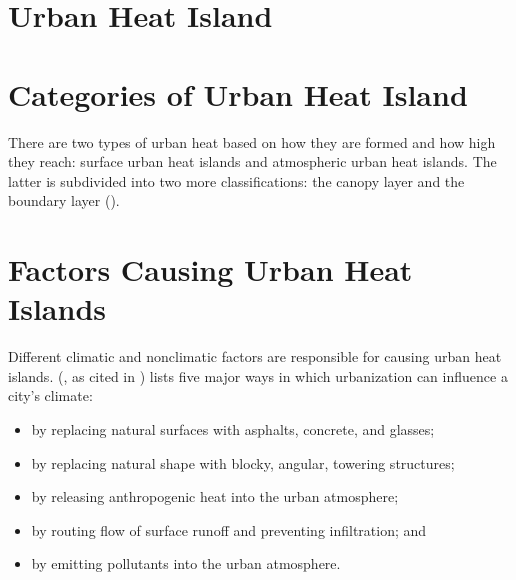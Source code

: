 \section{Urban Heat Island}

	\section{Categories of Urban Heat Island}
	
	There are two types of urban heat based on how they are formed and how high they reach:
	surface urban heat islands and atmospheric urban heat islands.
	The latter is subdivided into two more classifications:
	the canopy layer and the boundary layer (\cite{Zhou2018}).
	
	\section{Factors Causing Urban Heat Islands}
	
	Different climatic and nonclimatic factors are responsible for causing urban heat islands.
	\citeauthor{Bridgman1995} (\citeyear{Bridgman1995}, as cited in \cite{Khan2021}) lists five major ways in which urbanization can influence a city's climate:
	\begin{itemize}
		\item by replacing natural surfaces with asphalts, concrete, and glasses;
		\item by replacing natural shape with blocky, angular, towering structures;
		\item by releasing anthropogenic heat into the urban atmosphere;
		\item by routing flow of surface runoff and preventing infiltration; and
		\item by emitting pollutants into the urban atmosphere.
	\end{itemize}